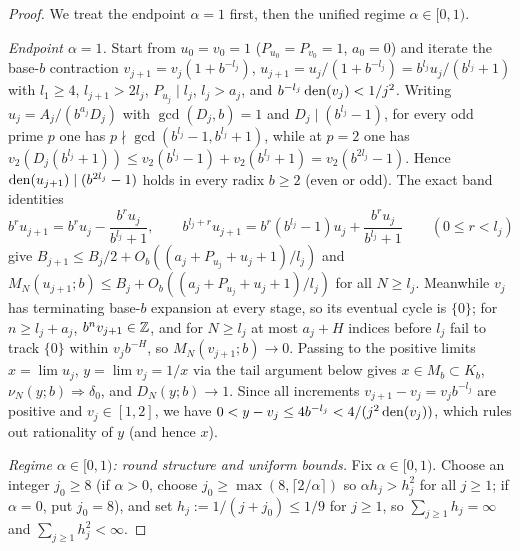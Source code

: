 \documentclass[11pt]{article}
\begin{document}
\begin{proof}
We treat the endpoint $\alpha=1$ first, then the unified regime $\alpha\in[0,1)$.

\emph{Endpoint $\alpha=1$.} Start from $u_0=v_0=1$ ($P_{u_0}=P_{v_0}=1$, $a_0=0$) and iterate the base-$b$ contraction $v_{j+1}=v_j(1+b^{-l_j})$, $u_{j+1}=u_j/(1+b^{-l_j})=b^{l_j}u_j/(b^{l_j}+1)$ with $l_1\ge4$, $l_{j+1}>2l_j$, $P_{u_j}\mid l_j$, $l_j>a_j$, and $b^{-l_j}\operatorname{den}(v_j)<1/j^2$. Writing $u_j=A_j/(b^{a_j}D_j)$ with $\gcd(D_j,b)=1$ and $D_j\mid(b^{l_j}-1)$, for every odd prime $p$ one has $p\nmid\gcd(b^{l_j}-1,b^{l_j}+1)$, while at $p=2$ one has $v_2(D_j(b^{l_j}+1))\le v_2(b^{l_j}-1)+v_2(b^{l_j}+1)=v_2(b^{2l_j}-1)$. Hence $\operatorname{den}(u_{j+1})\mid(b^{2l_j}-1)$ holds in every radix $b\ge2$ (even or odd). The exact band identities
\[
b^ru_{j+1}=b^ru_j-\frac{b^ru_j}{b^{l_j}+1},\qquad
b^{l_j+r}u_{j+1}=b^r(b^{l_j}-1)u_j+\frac{b^ru_j}{b^{l_j}+1}\qquad(0\le r<l_j)
\]
give $B_{j+1}\le B_j/2+O_b((a_j+P_{u_j}+u_j+1)/l_j)$ and $M_N(u_{j+1};b)\le B_j+O_b((a_j+P_{u_j}+u_j+1)/l_j)$ for all $N\ge l_j$. Meanwhile $v_j$ has terminating base-$b$ expansion at every stage, so its eventual cycle is $\{0\}$; for $n\ge l_j+a_j$, $b^nv_{j+1}\in\mathbb Z$, and for $N\ge l_j$ at most $a_j+H$ indices before $l_j$ fail to track $\{0\}$ within $v_jb^{-H}$, so $M_N(v_{j+1};b)\to0$. Passing to the positive limits $x=\lim u_j$, $y=\lim v_j=1/x$ via the tail argument below gives $x\in M_b\subset K_b$, $\nu_N(y;b)\Rightarrow\delta_0$, and $D_N(y;b)\to1$. Since all increments $v_{j+1}-v_j=v_jb^{-l_j}$ are positive and $v_j\in[1,2]$, we have $0<y-v_j\le 4b^{-l_j}<4/(j^2\operatorname{den}(v_j))$, which rules out rationality of $y$ (and hence $x$).

\emph{Regime $\alpha\in[0,1)$: round structure and uniform bounds.} Fix $\alpha\in[0,1)$. Choose an integer $j_0\ge8$ (if $\alpha>0$, choose $j_0\ge\max(8,\lceil 2/\alpha\rceil)$ so $\alpha h_j>h_j^2$ for all $j\ge1$; if $\alpha=0$, put $j_0=8$), and set $h_j:=1/(j+j_0)\le1/9$ for $j\ge1$, so $\sum_{j\ge1}h_j=\infty$ and $\sum_{j\ge1}h_j^2<\infty$.


\end{proof}
\end{document}
